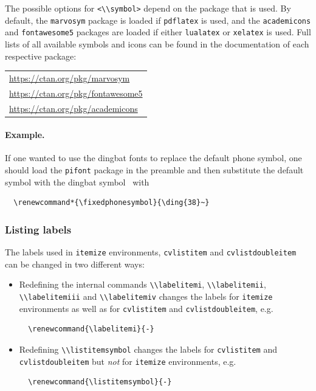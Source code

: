 \documentclass[a4paper, 11pt]{article}
\newcommand{\code}[1]{\lstinline!#1!}
\begin{document}
The possible options for \code{<\\symbol>} depend on the package that is used.
By default, the \code{marvosym} package is loaded if \code{pdflatex} is used, and the \code{academicons} and \code{fontawesome5} packages are loaded if either \code{lualatex} or \code{xelatex} is used.
Full lists of all available symbols and icons can be found in the documentation of each respective package:

\begin{tabular}{l}
  \url{https://ctan.org/pkg/marvosym} \\[1ex]
  \url{https://ctan.org/pkg/fontawesome5} \\[1ex]
  \url{https://ctan.org/pkg/academicons}
\end{tabular}

\paragraph{Example.}
If one wanted to use the dingbat fonts to replace the default phone symbol, one should load the \code{pifont} package in the preamble and then substitute the default symbol with the dingbat symbol \ with
\begin{lstlisting}
  \renewcommand*{\fixedphonesymbol}{\ding{38}~}
\end{lstlisting}

\subsubsection{Listing labels}
The labels used in \code{itemize} environments, \code{cvlistitem} and \code{cvlistdoubleitem} can be changed in two different ways:

\begin{itemize}
  \item Redefining the internal commands \code{\\labelitemi}, \code{\\labelitemii}, \code{\\labelitemiii} and \code{\\labelitemiv} changes the labels for \code{itemize} environments as well as for \code{cvlistitem} and \code{cvlistdoubleitem}, e.g.
  \begin{lstlisting}
  \renewcommand{\labelitemi}{-}
  \end{lstlisting}
  \item Redefining \code{\\listitemsymbol} changes the labels for \code{cvlistitem} and \code{cvlistdoubleitem} but \emph{not} for \code{itemize} environments, e.g.
  \begin{lstlisting}
  \renewcommand{\listitemsymbol}{-}
\end{lstlisting}
\end{itemize}
\end{document}
